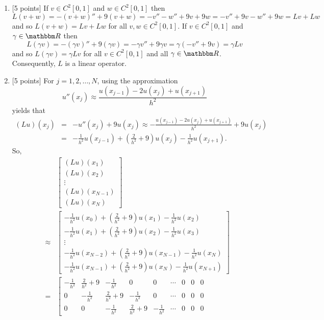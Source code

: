 \begin{solution}
\begin{enumerate}
\item {[5 points]} If $v\in C^2[0,1]$ and $w\in C^2[0,1]$ then
\[
L(v+w)=-(v+w)''+9(v+w)=-v''-w''+9v+9w=-v''+9v-w''+9w=Lv+Lw
\]
and so $L(v+w)=Lv+Lw$ for all $v,w\in C^2[0,1]$. If $v\in C^2[0,1]$ and $\gamma\in\R$ then
\[
L(\gamma v)=-(\gamma v)''+9(\gamma v)=-\gamma v''+9\gamma v=\gamma(-v''+9v)=\gamma Lv
\]
and so $L(\gamma v)=\gamma Lv$ for all $v\in C^2[0,1]$ and all $\gamma\in\R$. Consequently, $L$ is a linear operator.
\\
\item {[5 points]} For $j=1,2,\ldots,N$, using the approximation
\[
u''(x_j)\approx\frac{u(x_{j-1})-2u(x_j)+u(x_{j+1})}{h^2}
\]
yields that
\begin{eqnarray*}
(Lu)(x_j)&=&-u''(x_j)+9u(x_j)\approx-\frac{u(x_{j-1})-2u(x_j)+u(x_{j+1})}{h^2}+9u(x_j)
\\
&=&-\frac{1}{h^2}u(x_{j-1})+\left(\frac{2}{h^2}+9\right)u(x_j)-\frac{1}{h^2}u(x_{j+1}).
\end{eqnarray*}
So,
\begin{eqnarray*}
&&\left[\begin{array}{c} (Lu)(x_1) \\ (Lu)(x_2) \\ \vdots \\ (Lu)(x_{N-1}) \\ (Lu)(x_N) \end{array}\right]
\\
&\approx&\left[\begin{array}{c} -\frac{1}{h^2}u(x_0)+\left(\frac{2}{h^2}+9\right)u(x_1)-\frac{1}{h^2}u(x_2) \\ -\frac{1}{h^2}u(x_1)+\left(\frac{2}{h^2}+9\right)u(x_2)-\frac{1}{h^2}u(x_3) \\ \vdots \\ -\frac{1}{h^2}u(x_{N-2})+\left(\frac{2}{h^2}+9\right)u(x_{N-1})-\frac{1}{h^2}u(x_N) \\ -\frac{1}{h^2}u(x_{N-1})+\left(\frac{2}{h^2}+9\right)u(x_N)-\frac{1}{h^2}u(x_{N+1}) \end{array}\right]
\\
&=&
\left[\begin{array}{ccccccccc} 
-\frac{1}{h^2} & \frac{2}{h^2}+9 & -\frac{1}{h^2} & 0 & 0 & \cdots & 0 & 0 & 0
\\
0 & -\frac{1}{h^2} & \frac{2}{h^2}+9 & -\frac{1}{h^2} & 0 & \cdots & 0 & 0 & 0
\\
0 & 0 & -\frac{1}{h^2} & \frac{2}{h^2}+9 & -\frac{1}{h^2} & \cdots & 0 & 0 & 0

\end{array}
\end{eqnarray*}
\end{enumerate}
\end{solution}
